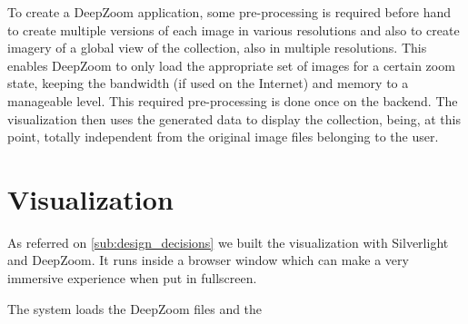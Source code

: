 To create a DeepZoom application, some pre-processing is required before hand to create multiple versions of each image in various resolutions and also to create imagery of a global view of the collection, also in multiple resolutions. This enables DeepZoom to only load the appropriate set of images for a certain zoom state, keeping the bandwidth (if used on the Internet) and memory  to a manageable level. This required pre-processing   is done once on the backend. The visualization then uses the generated data to display the collection, being, at this point, totally independent from the original image files belonging to the user.




\section{Visualization} %
\label{sub:visualization}

As referred on \ref{sub:design_decisions} we built the visualization with Silverlight and DeepZoom. It runs inside a browser window which can make a very immersive experience when put in fullscreen.

The system loads the DeepZoom files and the 












\cleardoublepage
